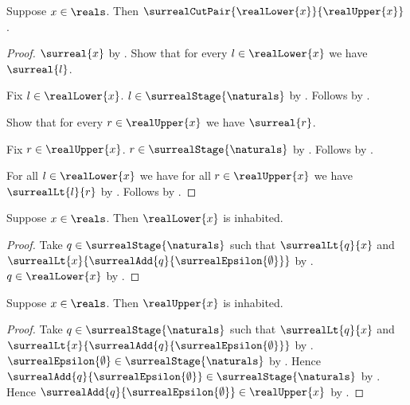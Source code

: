 \begin{proposition}\label{surreal_real_bounds_cut_pair}
    Suppose $x\in\reals$.
    Then $\surrealCutPair{\realLower{x}}{\realUpper{x}}$.
\end{proposition}
\begin{proof}
    $\surreal{x}$ by .
    Show that for every $l\in\realLower{x}$ we have $\surreal{l}$.
    \begin{subproof}
        Fix $l\in\realLower{x}$.
        $l\in\surrealStage{\naturals}$
            by .
        Follows by
            .
    \end{subproof}
    Show that for every $r\in\realUpper{x}$ we have $\surreal{r}$.
    \begin{subproof}
        Fix $r\in\realUpper{x}$.
        $r\in\surrealStage{\naturals}$
            by .
        Follows by
            .
    \end{subproof}
    For all $l\in\realLower{x}$ we have for all
        $r\in\realUpper{x}$ we have $\surrealLt{l}{r}$
        by
        .
    Follows by .
\end{proof}

\begin{proposition}\label{surreal_real_lower_inhabited}
    Suppose $x\in\reals$.
    Then $\realLower{x}$ is inhabited.
\end{proposition}
\begin{proof}
    Take $q\in\surrealStage{\naturals}$ such that
        $\surrealLt{q}{x}$ and
        $\surrealLt{x}{\surrealAdd{q}{\surrealEpsilon{\emptyset}}}$
        by
        .
    $q\in\realLower{x}$ by .
\end{proof}

\begin{proposition}\label{surreal_real_upper_inhabited}
    Suppose $x\in\reals$.
    Then $\realUpper{x}$ is inhabited.
\end{proposition}
\begin{proof}
    Take $q\in\surrealStage{\naturals}$ such that
        $\surrealLt{q}{x}$ and
        $\surrealLt{x}{\surrealAdd{q}{\surrealEpsilon{\emptyset}}}$
        by
        .
    $\surrealEpsilon{\emptyset}\in\surrealStage{\naturals}$
        by
        .
    Hence $\surrealAdd{q}{\surrealEpsilon{\emptyset}}
        \in\surrealStage{\naturals}$
        by .
    Hence $\surrealAdd{q}{\surrealEpsilon{\emptyset}}
        \in\realUpper{x}$
        by .
\end{proof}

